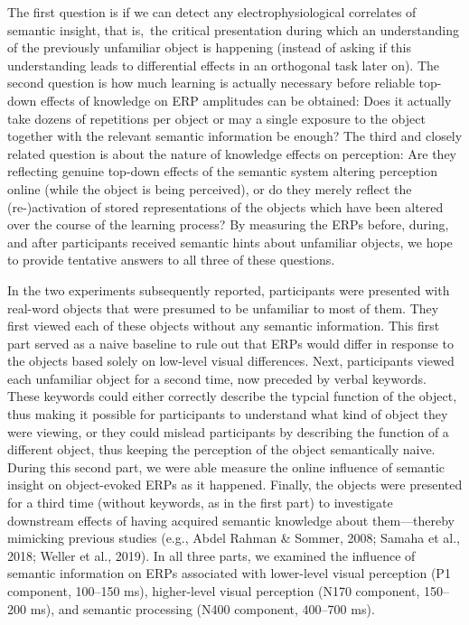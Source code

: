\documentclass[
  english,
  man,12pt,twoside]{apa7}
\begin{document}
The first question is if we can detect any electrophysiological correlates of semantic insight, that is,~the critical presentation during which an understanding of the previously unfamiliar object is happening (instead of asking if this understanding leads to differential effects in an orthogonal task later on). The second question is how much learning is actually necessary before reliable top-down effects of knowledge on ERP amplitudes can be obtained: Does it actually take dozens of repetitions per object or may a single exposure to the object together with the relevant semantic information be enough? The third and closely related question is about the nature of knowledge effects on perception: Are they reflecting genuine top-down effects of the semantic system altering perception online (while the object is being perceived), or do they merely reflect the (re-)activation of stored representations of the objects which have been altered over the course of the learning process? By measuring the ERPs before, during, and after participants received semantic hints about unfamiliar objects, we hope to provide tentative answers to all three of these questions.

In the two experiments subsequently reported, participants were presented with real-word objects that were presumed to be unfamiliar to most of them. They first viewed each of these objects without any semantic information. This first part served as a naive baseline to rule out that ERPs would differ in response to the objects based solely on low-level visual differences. Next, participants viewed each unfamiliar object for a second time, now preceded by verbal keywords. These keywords could either correctly describe the typcial function of the object, thus making it possible for participants to understand what kind of object they were viewing, or they could mislead participants by describing the function of a different object, thus keeping the perception of the object semantically naive. During this second part, we were able measure the online influence of semantic insight on object-evoked ERPs as it happened. Finally, the objects were presented for a third time (without keywords, as in the first part) to investigate downstream effects of having acquired semantic knowledge about them---thereby mimicking previous studies (e.g., Abdel Rahman \& Sommer, 2008; Samaha et al., 2018; Weller et al., 2019). In all three parts, we examined the influence of semantic information on ERPs associated with lower-level visual perception (P1 component, 100--150 ms), higher-level visual perception (N170 component, 150--200 ms), and semantic processing (N400 component, 400--700 ms).
\end{document}
